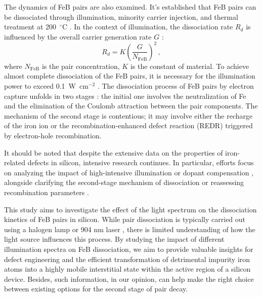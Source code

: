 \documentclass{WileyMSP-template}
\begin{document}
The dynamics of FeB pairs are also examined.
It's established that FeB pairs can be dissociated through illumination, minority carrier injection, and thermal treatment at 200~$^\circ$C \cite{FeBAssJAP2014}.
In the context of illumination, the dissociation rate $R_d$ is influenced by the overall carrier generation rate $G$ \cite{FeBLight2,FeBAssJAP2014,FeBKin2019,FeMethod2012}:
\begin{equation}
\label{eqRd}
R_d=K\left(\frac{G}{N_\mathrm{FeB}}\right)^2\,,
\end{equation}
where
$N_\mathrm{FeB}$ is the pair concentration,
$K$ is the constant of material.
To achieve almost complete dissociation of the FeB pairs, it is necessary for the illumination power to exceed 0.1~W~cm$^{-2}$ \cite{Macdonald2004}.
The dissociation process of FeB pairs by electron capture unfolds in two stages \cite{KIMERLINGFeB,FeBAssJAP2014}:
the initial one involves the neutralization of Fe and the elimination of the Coulomb attraction between the pair components.
The mechanism of the second stage is contentious; it may involve either the recharge of the iron ion or the recombination-enhanced defect reaction
(REDR) triggered by electron-hole recombination.


It should be noted that despite the extensive data on the properties of iron-related defects in silicon, intensive research continues.
In particular, efforts focus on analyzing the impact of high-intensive  illumination \cite{FeBStrongIll}
or dopant compensation \cite{Zhu2015},
alongside clarifying the second-stage mechanism of dissociation \cite{Sun2021}
or reassessing recombination parameters \cite{Le2024}.

This study aims to investigate the effect of the light spectrum on the dissociation kinetics of FeB pairs in silicon.
While pair dissociation is typically carried out using a halogen lamp \cite{FeBLight2,Sun2021}
or 904 nm laser \cite{FeBStrongIll,FeBAssJAP2014,lauer2016}, there is limited understanding of how the light source influences this process.
By studying the impact of different illumination spectra on FeB dissociation,
we aim to provide valuable insights for defect engineering and the efficient transformation of detrimental impurity iron atoms into a highly mobile interstitial state
within the active region of a silicon device.
Besides, such information, in our opinion, can help make the right choice between existing options for the second stage of pair decay.
\end{document}
